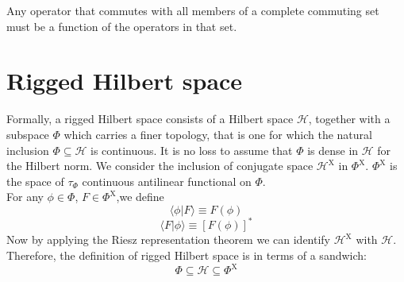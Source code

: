 \begin{newthem}
Any operator that commutes with all members of a complete commuting set must be a function of the operators in that set.
\end{newthem}

\section{Rigged Hilbert space}
\begin{newdef}
Formally, a rigged Hilbert space consists of a Hilbert space $\mathcal{H}$, together with a subspace $\Phi$ which carries a finer topology, that is one for which the natural inclusion $\Phi \subseteq \mathcal{H}$ is continuous. 
It is no loss to assume that $\Phi$ is dense in $\mathcal{H}$ for the Hilbert norm. We consider the inclusion of conjugate space $\mathcal{H}^{\mathrm{X}}$ in $\Phi^{\mathrm{X}}$. $\Phi^{\mathrm{X}}$ is the space of $\tau_{\Phi}$ continuous antilinear functional on $\Phi$.\\
For any $\phi \in \Phi$, $F \in \Phi^{\mathrm{X}}$,we define
\[\langle \phi | F \rangle \equiv F(\phi)\]
\[\langle F | \phi \rangle \equiv [F(\phi)]^*\]
Now by applying the Riesz representation theorem we can identify $\mathcal{H}^{\mathrm{X}}$ with $\mathcal{H}$. Therefore, the definition of rigged Hilbert space is in terms of a sandwich:
\[\Phi \subseteq \mathcal{H} \subseteq \Phi^{\mathrm{X}}\]
\end{newdef}

